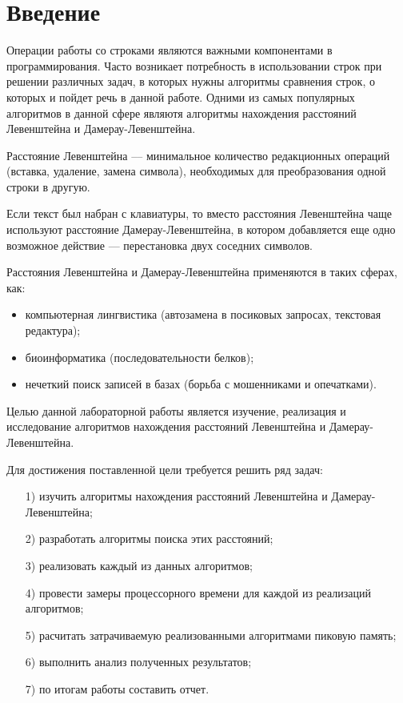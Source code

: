 
\chapter*{Введение}

Операции работы со строками являются важными компонентами в программирования. Часто возникает потребность в использовании строк при решении различных
задач, в которых нужны алгоритмы сравнения строк, о которых
и пойдет речь в данной работе. Одними из самых популярных алгоритмов в данной сфере являютя алгоритмы нахождения расстояний Левенштейна и Дамерау-Левенштейна.

Расстояние Левенштейна --– минимальное количество редакционных операций (вставка, удаление, замена символа), необходимых для преобразования одной строки в другую. 

Если текст был набран с клавиатуры, то вместо расстояния Левенштейна чаще используют расстояние Дамерау-Левенштейна, в котором добавляется еще одно возможное действие --- перестановка двух соседних символов.

Расстояния Левенштейна и Дамерау-Левенштейна применяются в таких сферах, как: 
\begin{itemize}
	\item компьютерная лингвистика (автозамена в посиковых запросах, текстовая редактура);
	\item биоинформатика (последовательности белков);
	\item нечеткий поиск записей в базах (борьба с мошенниками и опечатками).
\end{itemize}

Целью данной лабораторной работы является изучение, реализация и исследование
алгоритмов нахождения расстояний Левенштейна и Дамерау-Левенштейна.

Для достижения поставленной цели требуется решить ряд задач:
\begin{enumerate}
	\item[1)] изучить алгоритмы нахождения расстояний Левенштейна и Дамерау-Левенштейна;
	\item[2)] разработать алгоритмы поиска этих расстояний;
	\item[3)] реализовать каждый из данных алгоритмов;
	\item[4)] провести замеры процессорного времени для каждой из реализаций алгоритмов;
	\item[5)] расчитать затрачиваемую реализованными алгоритмами пиковую память;
 	\item[6)] выполнить анализ полученных результатов;
	\item[7)] по итогам работы составить отчет.
\end{enumerate}

\newpage
